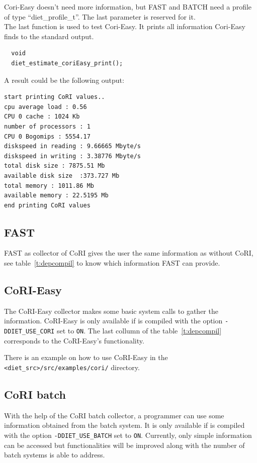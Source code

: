 Cori-Easy doesn't need more information, but FAST and BATCH need a profile of
type ``diet\_profile\_t''. The last parameter is reserved for it. \\ The last
function is used to test Cori-Easy. It prints all information Cori-Easy finds
to the standard output.

\footnotesize
\begin{verbatim}
  void
  diet_estimate_coriEasy_print();
\end{verbatim}
\normalsize
A result could be the following output:
\footnotesize
\begin{verbatim}
start printing CoRI values..
cpu average load : 0.56
CPU 0 cache : 1024 Kb
number of processors : 1
CPU 0 Bogomips : 5554.17
diskspeed in reading : 9.66665 Mbyte/s
diskspeed in writing : 3.38776 Mbyte/s
total disk size : 7875.51 Mb
available disk size  :373.727 Mb
total memory : 1011.86 Mb
available memory : 22.5195 Mb
end printing CoRI values
\end{verbatim}
\normalsize

\subsection{FAST}
FAST as collector of CoRI gives the user the same information as without CoRI,
see table~\ref{t:depcompil} to know which information FAST can provide.

\subsection{CoRI-Easy}
The CoRI-Easy collector makes some basic system calls to gather the
information. CoRI-Easy is only available if \diet is compiled with the option
\texttt{-DDIET\_USE\_CORI} set to \texttt{ON}. The last collumn of the
table~\ref{t:depcompil} corresponds to the CoRI-Easy's functionality.

There is an example on how to use CoRI-Easy in the
\verb!<diet_src>/src/examples/cori/! directory.

\subsection{CoRI batch}\label{section:cori_batch}

With the help of the CoRI batch collector, a \sed programmer can use some
information obtained from the batch system. It is only available if \diet is
compiled with the option \texttt{-DDIET\_USE\_BATCH} set to
\texttt{ON}. Currently, only simple information can be accessed but
functionalities will be improved along with the number of batch systems \diet
is able to address.

